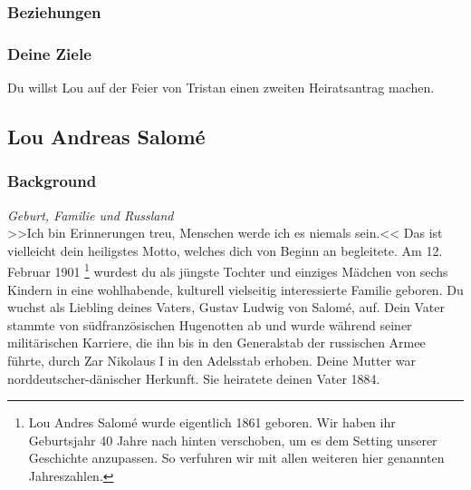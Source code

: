 \documentclass[12pt, a4paper, openany]{report}
\begin{document}
\subsubsection{Beziehungen}
\subsubsection{Deine Ziele}
Du willst Lou auf der Feier von Tristan einen zweiten Heiratsantrag machen.

\subsection{Lou Andreas Salomé}
\subsubsection{Background}

\textit{Geburt, Familie und Russland}\\
>>Ich bin Erinnerungen treu, Menschen werde ich es niemals sein.<< 
Das ist vielleicht dein heiligstes Motto, welches dich von Beginn an begleitete.
Am 12. Februar 1901%
\footnote{
  Lou Andres Salomé wurde eigentlich 1861 geboren. 
  Wir haben ihr Geburtsjahr 40 Jahre nach hinten verschoben, um es dem Setting unserer Geschichte anzupassen. 
  So verfuhren wir mit allen weiteren hier genannten Jahreszahlen.
}
wurdest du als jüngste Tochter und einziges Mädchen von sechs Kindern in eine wohlhabende, kulturell vielseitig interessierte Familie geboren. 
Du wuchst als Liebling deines Vaters, Gustav Ludwig von Salomé, auf. 
Dein Vater stammte von südfranzösischen Hugenotten ab und wurde während seiner militärischen Karriere, die ihn bis in den Generalstab der russischen Armee führte, durch Zar Nikolaus I in den Adelsstab erhoben.
Deine Mutter war norddeutscher-dänischer Herkunft. 
Sie heiratete deinen Vater 1884.
\end{document}
